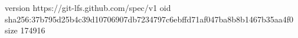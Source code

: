 version https://git-lfs.github.com/spec/v1
oid sha256:37b795d25b4c39d10706907db7234797c6ebffd71af047ba8b8b1467b35aa4f0
size 174916

